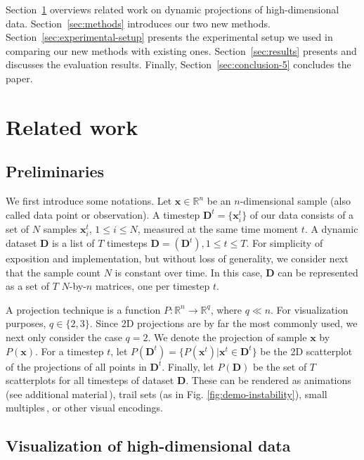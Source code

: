 Section~\ref{sec:background} overviews related work on dynamic projections of high-dimensional data. Section~\ref{sec:methods} introduces our two new methods. Section~\ref{sec:experimental-setup} presents the experimental setup we used in comparing our new methods with existing ones. Section~\ref{sec:results} presents and discusses the evaluation results. Finally, Section~\ref{sec:conclusion-5} concludes the paper.

  
\vspace{-0.15cm}
\section{Related work}
\label{sec:background}

\subsection{Preliminaries}
%
We first introduce some notations. Let
$\mathbf{x} \in \mathbb{R}^n$
be an $n$-dimensional sample (also called data point or observation). A timestep $\mathbf{D}^t = \{\mathbf{x}_i^t\}$ of our data consists of a set of $N$ samples $\mathbf{x}_i^t$, $1 \leq i \leq N$, 
measured at the same time moment $t$. A dynamic dataset $\mathbf{D}$ is a list of $T$ timesteps $\mathbf{D}= ( \mathbf{D}^{t} ), 1 \leq t \leq T$. For simplicity of exposition and implementation, but without loss of generality, we consider next that the sample count $N$ is constant over time. In this case, $\mathbf{D}$ can be represented as a set of $T$ $N$-by-$n$ matrices, one per timestep $t$.

A projection technique is a function $P: \mathbb{R}^{n} \rightarrow \mathbb{R}^{q}$, where $q \ll n$. For visualization purposes, $q \in \{2,3\}$. Since 2D projections are by far the most commonly used, we next only consider the case $q=2$. We denote the projection of sample $\mathbf{x}$ by $P(\mathbf{x})$. For a timestep $t$, let $P(\mathbf{D}^{t}) = \{ P(\mathbf{x}^t) | \mathbf{x}^t \in \mathbf{D}^{t} \}$ be the 2D scatterplot of the projections of all points in
$\mathbf{D}^{t}$. Finally, let $P(\mathbf{D})$ be the set of $T$ scatterplots for all timesteps of dataset $\mathbf{D}$. These can be rendered as animations (see additional material\,\citep{repo-guided}), trail sets (as in Fig. \ref{fig:demo-instability}), small multiples\,\citep{Rauber2016}, or other visual encodings. 


\subsection{Visualization of high-dimensional data}
\label{sec:rw_vis_dynamic}
%

